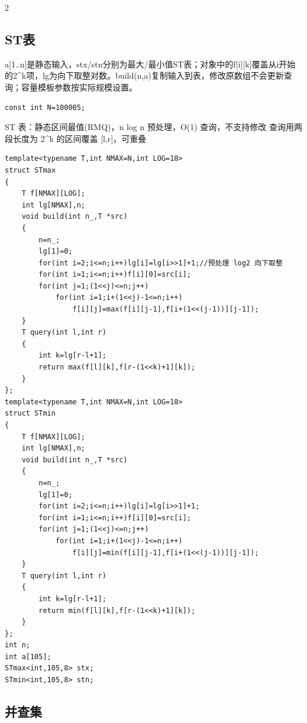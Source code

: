 \documentclass[UTF8,fontset=fandol,a4paper,twoside]{ctexart}
\newcommand{\note}[1]{{\fontsize{10}{12}\selectfont #1\par}}
\begin{document}
\begin{multicols}{2}
\subsection{ST表}

\note{a[\allowbreak{}1.\allowbreak{}.\allowbreak{}n]\allowbreak{}是静态输入，stx/\allowbreak{}stn分别为最大/\allowbreak{}最小值ST表；对象中的f[\allowbreak{}i]\allowbreak{}[\allowbreak{}k]\allowbreak{}覆盖从i开始的2\textasciicircum{}k项，lg为向下取整对数。build(\allowbreak{}n,\allowbreak{}a)\allowbreak{}复制输入到表，修改原数组不会更新查询；容量模板参数按实际规模设置。}
\begin{lstlisting}
const int N=100005;
\end{lstlisting}
\note{ST 表：静态区间最值(\allowbreak{}RMQ)\allowbreak{}，n log n 预处理，O(\allowbreak{}1)\allowbreak{} 查询，不支持修改 查询用两段长度为 2\textasciicircum{}k 的区间覆盖 [\allowbreak{}l,\allowbreak{}r]\allowbreak{}，可重叠}
\begin{lstlisting}
template<typename T,int NMAX=N,int LOG=18>
struct STmax
{
    T f[NMAX][LOG];
    int lg[NMAX],n;
    void build(int n_,T *src)
    {
        n=n_;
        lg[1]=0;
        for(int i=2;i<=n;i++)lg[i]=lg[i>>1]+1;//预处理 log2 向下取整
        for(int i=1;i<=n;i++)f[i][0]=src[i];
        for(int j=1;(1<<j)<=n;j++)
            for(int i=1;i+(1<<j)-1<=n;i++)
                f[i][j]=max(f[i][j-1],f[i+(1<<(j-1))][j-1]);
    }
    T query(int l,int r)
    {
        int k=lg[r-l+1];
        return max(f[l][k],f[r-(1<<k)+1][k]);
    }
};
template<typename T,int NMAX=N,int LOG=18>
struct STmin
{
    T f[NMAX][LOG];
    int lg[NMAX],n;
    void build(int n_,T *src)
    {
        n=n_;
        lg[1]=0;
        for(int i=2;i<=n;i++)lg[i]=lg[i>>1]+1;
        for(int i=1;i<=n;i++)f[i][0]=src[i];
        for(int j=1;(1<<j)<=n;j++)
            for(int i=1;i+(1<<j)-1<=n;i++)
                f[i][j]=min(f[i][j-1],f[i+(1<<(j-1))][j-1]);
    }
    T query(int l,int r)
    {
        int k=lg[r-l+1];
        return min(f[l][k],f[r-(1<<k)+1][k]);
    }
};
int n;
int a[105];
STmax<int,105,8> stx;
STmin<int,105,8> stn;
\end{lstlisting}
\subsection{并查集}


\end{multicols}
\end{document}
